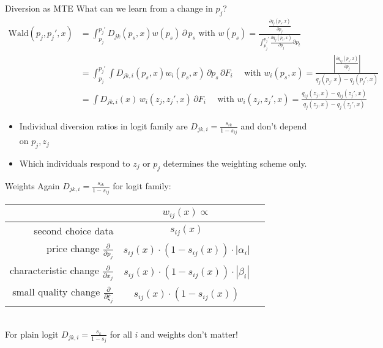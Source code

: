 \documentclass[aspectratio=169,10pt]{beamer}
\begin{document}
\begin{frame}{Diversion as MTE}
\footnotesize
What can we learn from a change in $p_j$?
\begin{align*}
\text{Wald}(p_j, p_j',x)
&=\int_{p_j}^{p_j'} D_{jk}(p_s,x) w(p_s) \, \partial \, p_s \mbox{ with }
w(p_s)=\frac{  \frac{\partial q_j(p_s,x)}{\partial p_j} }{\int_{p_j}^{p_j'}  \frac{\partial q_j(p_t,x)}{\partial p_j} \partial p_t} \\
\nonumber &=\int_{p_j}^{p_j'} \int D_{jk,i}(p_s,x)  w_i(p_s,x) \, \partial p_s  \, \partial F_i \quad \mbox{ with } w_i(p_s,x) = \frac{\left| \frac{\partial q_{ij}(p_s,x)}{\partial p_j} \right|}{q_j(p_j,x)- q_j(p_j',x)}\\
&= \int D_{jk,i}(x) \, w_i(z_j,z_j',x)  \, \partial F_i \quad \mbox{ with } w_i(z_j,z_j',x) = \frac{q_{ij}(z_j,x)- q_{ij}(z_j',x) }{q_j(z_j,x)- q_j(z_j',x)}
\end{align*}
\begin{itemize}
\item Individual diversion ratios in logit family are $D_{jk,i} = \frac{s_{ik}}{1-s_{ij}}$ and don't depend on $p_j,z_j$
\item Which individuals respond to $z_j$ or $p_j$ determines the weighting scheme only.
\end{itemize}
\end{frame}

\begin{frame}{Weights}
Again $D_{jk,i} = \frac{s_{ik}}{1-s_{ij}}$ for logit family:\\
\begin{tabular}{rcc} 
& $w_{i j}(x) \propto$ \\
\midrule second choice data & $s_{i j}(x)$ \\
price change $\frac{\partial}{\partial p_{j}}$ & $s_{i j}(x) \cdot\left(1-s_{i j}(x)\right) \cdot\left|\alpha_{i}\right|$ \\
characteristic change $\frac{\partial}{\partial x_{j}}$ & $s_{i j}(x) \cdot\left(1-s_{i j}(x)\right) \cdot\left|\beta_{i}\right|$ \\
small quality change $\frac{\partial}{\partial \xi_{j}}$ & $s_{i j}(x) \cdot\left(1-s_{i j}(x)\right)$ \\
\midrule
\end{tabular}\\
For plain logit $D_{jk,i} = \frac{s_{k}}{1-s_{j}}$ for all $i$ and weights don't matter!
\end{frame}
\end{document}
